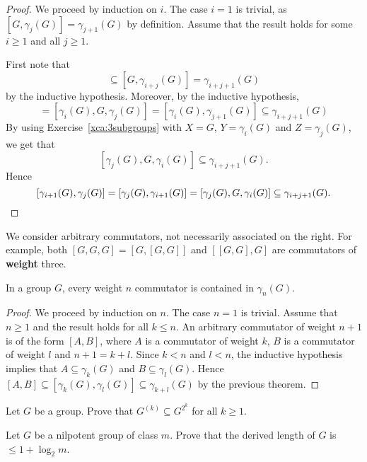 \begin{proof}
We proceed by induction on $i$. The case $i=1$ is trivial, as
$[G,\gamma_j(G)]=\gamma_{j+1}(G)$ by definition. Assume that
the result holds for some $i\geq1$ and all $j\geq 1$. 
	
First note that 
\begin{equation*}
[G,\gamma_i(G),\gamma_j(G)]\subseteq [G,\gamma_{i+j}(G)]=\gamma_{i+j+1}(G)
\end{equation*}
by the inductive hypothesis. Moreover, by the inductive hypothesis, 
\begin{equation*}
[\gamma_i(G),\gamma_j(G),G]=[\gamma_i(G),G,\gamma_j(G)]=[\gamma_{i}(G),\gamma_{j+1}(G)]\subseteq \gamma_{i+j+1}(G)
\end{equation*}
By using Exercise~\ref{xca:3subgroups} with $X=G$, $Y=\gamma_i(G)$ and $Z=\gamma_j(G)$,
we get that 
\[
[\gamma_j(G),G,\gamma_i(G)]\subseteq \gamma_{i+j+1}(G).
\]
Hence  
\[
[\gamma_{i+1}(G),\gamma_{j}(G)]=[\gamma_{j}(G),\gamma_{i+1}(G)]=[\gamma_j(G),G,\gamma_i(G)]\subseteq \gamma_{i+j+1}(G).\qedhere
\]
\end{proof}

We consider arbitrary commutators, not necessarily associated on the right.   
For example, both $[G,G,G]=[G,[G,G]]$ and $[[G,G],G]$ are commutators of \textbf{weight} three. 

\begin{corollary}
In a group $G$, every weight $n$ commutator is contained in 
$\gamma_n(G)$.
\end{corollary}

\begin{proof}
We proceed by induction on $n$. The case $n=1$ is trivial. Assume that $n\geq1$ and 
the result holds for all $k\leq n$. An arbitrary commutator of weight $n+1$ 
is of the form $[A,B]$, where $A$ is a commutator of weight $k$,
$B$ is a commutator of weight $l$ and $n+1=k+l$. Since $k<n$ and $l<n$, 
the inductive hypothesis implies that  $A\subseteq \gamma_k(G)$ and $B\subseteq
\gamma_l(G)$. Hence $[A,B]\subseteq [\gamma_k(G),\gamma_l(G)]\subseteq
\gamma_{k+l}(G)$ by the previous theorem.
\end{proof}

\begin{exercise}
\label{xca:inclusion}
    Let $G$ be a group. Prove that $G^{(k)}\subseteq G^{2^k}$ for all $k\geq1$. 
\end{exercise}

\begin{exercise}
\label{xca:derived_length}
    Let $G$ be a nilpotent group of class $m$. Prove that
    the derived length of $G$ is $\leq 1+\log_2m$.
\end{exercise}

